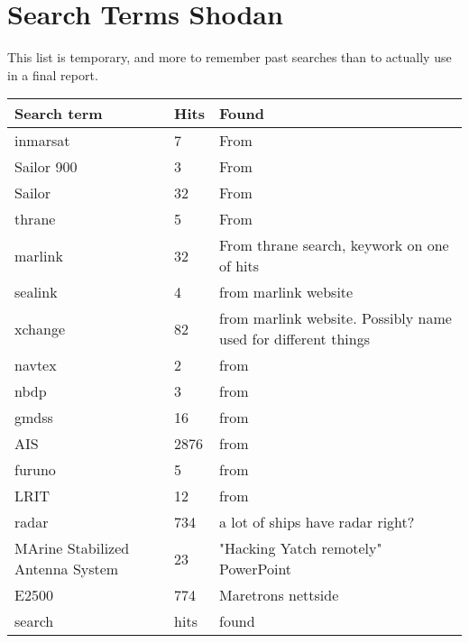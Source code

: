 

\section{Search Terms Shodan} \label{sec:search_term}
This list is temporary, and more to remember past searches than to actually use in a final report.
\begin{table}[H]
\centering
\begin{tabular}{|l|l|l|}
\hline
Search term & Hits & Found \\ \hline
inmarsat & 7 & From \cite{maritime_pen_test} \\ \hline
Sailor 900 & 3 & From \cite{maritime_pen_test} \\ \hline
Sailor & 32 & From \cite{maritime_pen_test} \\ \hline
thrane & 5 & From \cite{maritime_pen_test} \\ \hline
marlink & 32 &  From thrane search, keywork on one of hits \\ \hline
sealink & 4 &  from marlink website\\ \hline
xchange & 82 &  from marlink website. Possibly name used for different things\\ \hline
navtex & 2 &  from \cite{maritime_digitalization}\\ \hline
nbdp & 3 &  from \cite{maritime_digitalization}\\ \hline
gmdss & 16 &  from \cite{maritime_digitalization}\\ \hline
AIS & 2876 &  from \cite{maritime_digitalization}\\ \hline
furuno & 5 &  from \cite{maritime_digitalization}\\ \hline
LRIT & 12 &  from \cite{maritime_digitalization}\\ \hline
radar & 734 &  a lot of ships have radar right?\\ \hline
MArine Stabilized Antenna System & 23 &  "Hacking Yatch remotely" PowerPoint\\ \hline
E2500 & 774 &  Maretrons nettside\\ \hline
search & hits &  found\\ \hline
\end{tabular}
\end{table}


